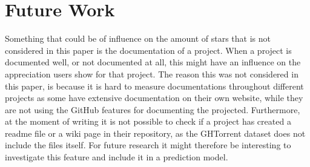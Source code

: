 \section{Future Work}
Something that could be of influence on the amount of stars that is not considered in this paper is the documentation of a project.
When a project is documented well, or not documented at all, this might have an influence on the appreciation users show for that project.
The reason this was not considered in this paper, is because it is hard to measure documentations throughout different projects as some have extensive documentation on their own website, while they are not using the GitHub features for documenting the projected.
Furthermore, at the moment of writing it is not possible to check if a project has created a readme file or a wiki page in their repository, as the GHTorrent dataset does not include the files itself. For future research it might therefore be interesting to investigate this feature and include it in a prediction model.
